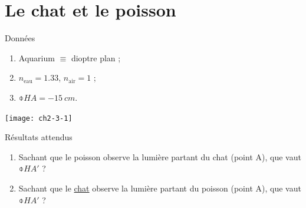 \documentclass[../main/main.tex]{subfiles}
\begin{document}
\section{Le chat et le poisson}
\begin{tcbraster}[raster columns=3, raster equal height=rows]
    \begin{NCdefi}[raster multicolumn=2, sidebyside]{Données}
        \begin{enumerate}
            \item Aquarium $\equiv$ dioptre plan ;
            \item $n _\mathrm{eau} = 1.33$, $n _\mathrm{air} = 1$ ;
            \item $\obar{HA} = \SI{-15}{cm}$.
        \end{enumerate}
        \tcblower
        \begin{center}
            \texttt{[image: ch2-3-1]}
        \end{center}            
    \end{NCdefi}    
    \begin{NCprop}{Résultats attendus}
        \begin{enumerate}
            \item Sachant que le poisson observe la lumière partant du chat (point
                A), que vaut $\obar{HA'}$ ?
            \item Sachant que le \underline{chat} observe la lumière partant du poisson
                (point A), que vaut $\obar{HA'}$ ?
        \end{enumerate}
    \end{NCprop}
\end{tcbraster}
\end{document}
